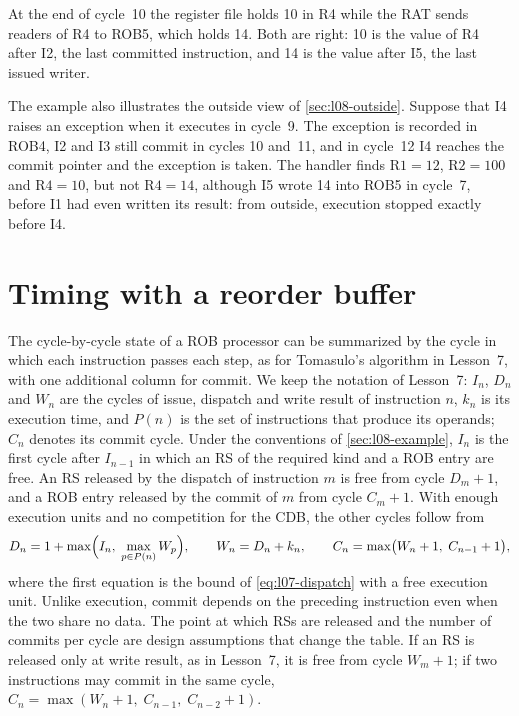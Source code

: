 \documentclass[../main.tex]{subfiles}
\begin{document}
At the end of cycle~10 the register file holds 10 in R4 while the RAT sends
readers of R4 to ROB5, which holds 14.  Both are right: 10 is the value of R4
after I2, the last committed instruction, and 14 is the value after I5, the
last issued writer.

The example also illustrates the outside view of \cref{sec:l08-outside}.
Suppose that I4 raises an exception when it executes in cycle~9.  The exception
is recorded in ROB4, I2 and I3 still commit in cycles 10 and~11, and in
cycle~12 I4 reaches the commit pointer and the exception is taken.  The
handler finds $\text{R1}=12$, $\text{R2}=100$ and $\text{R4}=10$, but not
$\text{R4}=14$, although I5 wrote 14 into ROB5 in cycle~7, before I1 had
even written its result: from outside, execution stopped exactly before I4.

\section{Timing with a reorder buffer}
\label{sec:l08-timing}

The cycle-by-cycle state of a ROB processor can be summarized by the cycle in
which each instruction passes each step, as for Tomasulo's algorithm in
Lesson~7, with one additional column for commit.  We keep the notation of Lesson~7: $I_n$, $D_n$ and $W_n$
are the cycles of issue, dispatch and write result of instruction $n$, $k_n$
is its execution time, and $P(n)$ is the set of instructions that produce its
operands; $C_n$ denotes its commit cycle.  Under the conventions of
\cref{sec:l08-example}, $I_n$ is the first cycle after $I_{n-1}$ in which an
RS of the required kind and a ROB entry are free.  An RS released by the
dispatch of instruction $m$ is free from cycle $D_m+1$, and a ROB entry
released by the commit of $m$ from cycle $C_m+1$.  With enough execution units
and no competition for the CDB, the other cycles follow from
\begin{equation}
  D_n = 1 + \max\Bigl(I_n,\; \max_{p \in P(n)} W_p\Bigr), \qquad
  W_n = D_n + k_n, \qquad
  C_n = \max\bigl(W_n + 1,\; C_{n-1} + 1\bigr),
  \label{eq:l08-timing}
\end{equation}
where the first equation is the bound of \cref{eq:l07-dispatch} with a free
execution unit.  Unlike execution, commit depends on
the preceding instruction even when the two share no data.  The point at which
RSs are released and the number of commits per cycle are design assumptions
that change the table.  If an RS is released only at write result, as in
Lesson~7, it is free from cycle $W_m+1$; if two instructions may commit in the
same cycle,
$C_n = \max(W_n+1,\; C_{n-1},\; C_{n-2}+1)$.
\end{document}
